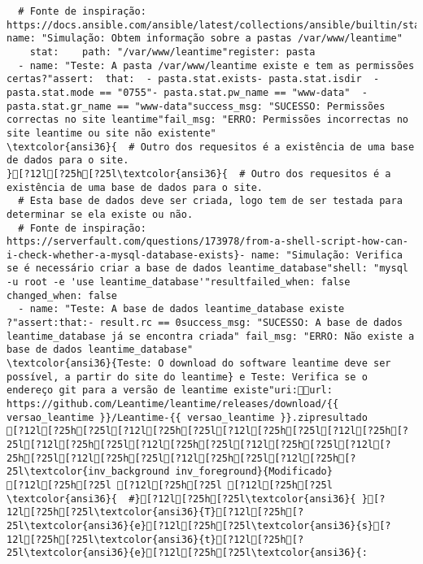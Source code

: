 \documentclass{scrartcl}
\begin{document}
\begin{Verbatim}
  # Fonte de inspiração: https://docs.ansible.com/ansible/latest/collections/ansible/builtin/stat_module.html}- name: "Simulação: Obtem informação sobre a pastas /var/www/leantime"
    stat:    path: "/var/www/leantime"register: pasta
  - name: "Teste: A pasta /var/www/leantime existe e tem as permissões certas?"assert:  that:  - pasta.stat.exists- pasta.stat.isdir  - pasta.stat.mode == "0755"- pasta.stat.pw_name == "www-data"  - pasta.stat.gr_name == "www-data"success_msg: "SUCESSO: Permissões correctas no site leantime"fail_msg: "ERRO: Permissões incorrectas no site leantime ou site não existente"
\textcolor{ansi36}{  # Outro dos requesitos é a existência de uma base de dados para o site.
}[?12l[?25h[?25l\textcolor{ansi36}{  # Outro dos requesitos é a existência de uma base de dados para o site.
  # Esta base de dados deve ser criada, logo tem de ser testada para determinar se ela existe ou não.
  # Fonte de inspiração: https://serverfault.com/questions/173978/from-a-shell-script-how-can-i-check-whether-a-mysql-database-exists}- name: "Simulação: Verifica se é necessário criar a base de dados leantime_database"shell: "mysql -u root -e 'use leantime_database'"resultfailed_when: false  changed_when: false
  - name: "Teste: A base de dados leantime_database existe ?"assert:that:- result.rc == 0success_msg: "SUCESSO: A base de dados leantime_database já se encontra criada" fail_msg: "ERRO: Não existe a base de dados leantime_database"
\textcolor{ansi36}{Teste: O download do software leantime deve ser possível, a partir do site do leantime} e Teste: Verifica se o endereço git para a versão de leantime existe"uri:url: https://github.com/Leantime/leantime/releases/download/{{ versao_leantime }}/Leantime-{{ versao_leantime }}.zipresultado
[?12l[?25h[?25l[?12l[?25h[?25l[?12l[?25h[?25l[?12l[?25h[?25l[?12l[?25h[?25l[?12l[?25h[?25l[?12l[?25h[?25l[?12l[?25h[?25l[?12l[?25h[?25l[?12l[?25h[?25l[?12l[?25h[?25l\textcolor{inv_background inv_foreground}{Modificado}
[?12l[?25h[?25l [?12l[?25h[?25l [?12l[?25h[?25l
\textcolor{ansi36}{  #}[?12l[?25h[?25l\textcolor{ansi36}{ }[?12l[?25h[?25l\textcolor{ansi36}{T}[?12l[?25h[?25l\textcolor{ansi36}{e}[?12l[?25h[?25l\textcolor{ansi36}{s}[?12l[?25h[?25l\textcolor{ansi36}{t}[?12l[?25h[?25l\textcolor{ansi36}{e}[?12l[?25h[?25l\textcolor{ansi36}{:

\end{Verbatim}
\end{document}
